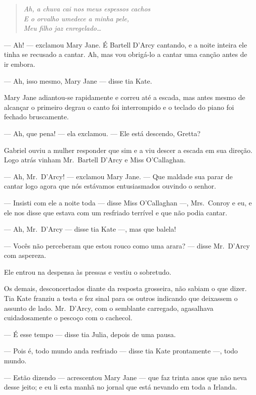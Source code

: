 \begin{verse}\itshape
Ah, a chuva cai nos meus espessos cachos\\
E o orvalho umedece a minha pele,\\
Meu filho jaz enregelado\ldots{}
\end{verse}

--- Ah! --- exclamou Mary Jane.  É Bartell D’Arcy cantando, e a noite inteira
ele tinha se recusado a cantar.  Ah, mas vou obrigá-lo a cantar uma canção
antes de ir embora.

--- Ah, isso mesmo, Mary Jane --- disse tia Kate.

Mary Jane adiantou-se rapidamente e correu até a escada, mas antes mesmo de
alcançar o primeiro degrau o canto foi interrompido e o teclado do piano foi
fechado bruscamente.

--- Ah, que pena! --- ela exclamou.  --- Ele está descendo, Gretta?

Gabriel ouviu a mulher responder que sim e a viu descer a escada em sua
direção.  Logo atrás vinham Mr.~Bartell D’Arcy e Miss O’Callaghan.

--- Ah, Mr.~D’Arcy! --- exclamou Mary Jane.  --- Que maldade sua parar de
cantar logo agora que nós estávamos entusiasmados ouvindo o senhor.

--- Insisti com ele a noite toda --- disse Miss O’Callaghan ---, Mrs.~Conroy e
eu, e ele nos disse que estava com um resfriado terrível e que não podia
cantar.

--- Ah, Mr.~D’Arcy --- disse tia Kate ---, mas que balela!

--- Vocês não perceberam que estou rouco como uma arara? --- disse Mr.~D’Arcy
com aspereza.

Ele entrou na despensa às pressas e vestiu o sobretudo.

Os demais, desconcertados diante da resposta grosseira, não sabiam o que dizer.
Tia Kate franziu a testa e fez sinal para os outros indicando que deixassem o
assunto de lado.  Mr.~D’Arcy, com o semblante carregado, agasalhava
cuidadosamente o pescoço com o cachecol.

--- É esse tempo --- disse tia Julia, depois de uma pausa.

--- Pois é, todo mundo anda resfriado --- disse tia Kate prontamente ---, todo
mundo.

--- Estão dizendo --- acrescentou Mary Jane --- que faz trinta anos que não
neva desse jeito; e eu li esta manhã no jornal que está nevando em toda a
Irlanda.

